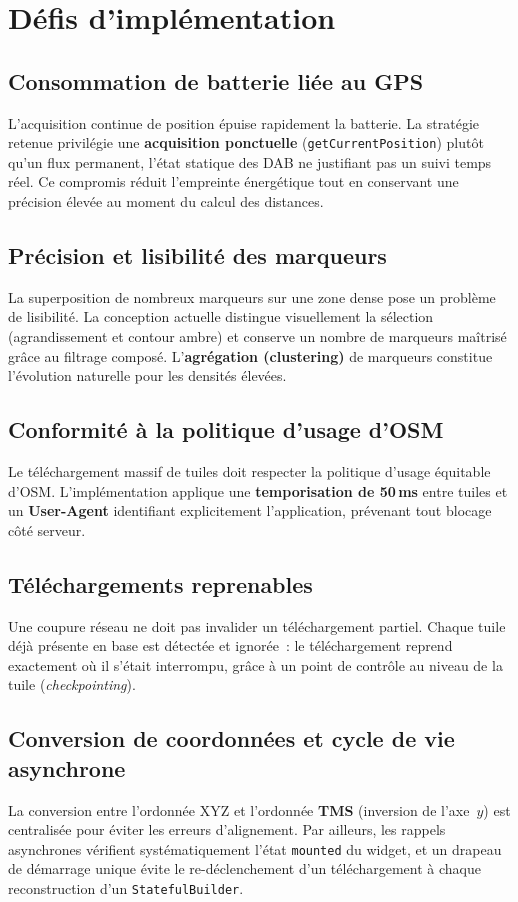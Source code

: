\documentclass[11pt,a4paper]{article}
\newcommand{\code}[1]{\texttt{#1}}
\begin{document}
\section{D\'efis d'impl\'ementation}
\subsection{Consommation de batterie li\'ee au GPS}
L'acquisition continue de position \'epuise rapidement la batterie. La strat\'egie
retenue privil\'egie une \textbf{acquisition ponctuelle} (\code{getCurrentPosition})
plut\^ot qu'un flux permanent, l'\'etat statique des DAB ne justifiant pas un
suivi temps r\'eel. Ce compromis r\'eduit l'empreinte \'energ\'etique tout en
conservant une pr\'ecision \'elev\'ee au moment du calcul des distances.

\subsection{Pr\'ecision et lisibilit\'e des marqueurs}
La superposition de nombreux marqueurs sur une zone dense pose un probl\`eme de
lisibilit\'e. La conception actuelle distingue visuellement la s\'election
(agrandissement et contour ambre) et conserve un nombre de marqueurs ma\^itris\'e
gr\^ace au filtrage compos\'e. L'\textbf{agr\'egation (clustering)} de marqueurs
constitue l'\'evolution naturelle pour les densit\'es \'elev\'ees.

\subsection{Conformit\'e \`a la politique d'usage d'OSM}
Le t\'el\'echargement massif de tuiles doit respecter la politique d'usage
\'equitable d'OSM. L'impl\'ementation applique une \textbf{temporisation de
50\,ms} entre tuiles et un \textbf{User-Agent} identifiant explicitement
l'application, pr\'evenant tout blocage c\^ot\'e serveur.

\subsection{T\'el\'echargements reprenables}
Une coupure r\'eseau ne doit pas invalider un t\'el\'echargement partiel. Chaque
tuile d\'ej\`a pr\'esente en base est d\'etect\'ee et ignor\'ee~: le
t\'el\'echargement reprend exactement o\`u il s'\'etait interrompu, gr\^ace \`a
un point de contr\^ole au niveau de la tuile (\emph{checkpointing}).

\subsection{Conversion de coordonn\'ees et cycle de vie asynchrone}
La conversion entre l'ordonn\'ee XYZ et l'ordonn\'ee \textbf{TMS} (inversion de
l'axe~$y$) est centralis\'ee pour \'eviter les erreurs d'alignement. Par
ailleurs, les rappels asynchrones v\'erifient syst\'ematiquement l'\'etat
\code{mounted} du widget, et un drapeau de d\'emarrage unique \'evite le
re-d\'eclenchement d'un t\'el\'echargement \`a chaque reconstruction d'un
\code{StatefulBuilder}.
\end{document}
